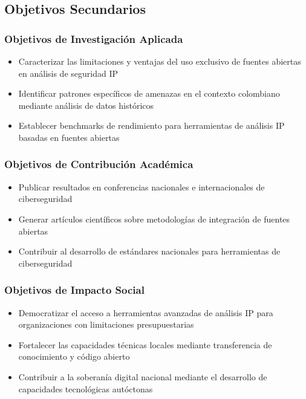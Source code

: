\subsection{Objetivos Secundarios}

\subsubsection{Objetivos de Investigación Aplicada}
\begin{itemize}
    \item Caracterizar las limitaciones y ventajas del uso exclusivo de fuentes abiertas en análisis de seguridad IP
    \item Identificar patrones específicos de amenazas en el contexto colombiano mediante análisis de datos históricos
    \item Establecer benchmarks de rendimiento para herramientas de análisis IP basadas en fuentes abiertas
\end{itemize}

\subsubsection{Objetivos de Contribución Académica}
\begin{itemize}
    \item Publicar resultados en conferencias nacionales e internacionales de ciberseguridad
    \item Generar artículos científicos sobre metodologías de integración de fuentes abiertas
    \item Contribuir al desarrollo de estándares nacionales para herramientas de ciberseguridad
\end{itemize}

\subsubsection{Objetivos de Impacto Social}
\begin{itemize}
    \item Democratizar el acceso a herramientas avanzadas de análisis IP para organizaciones con limitaciones presupuestarias
    \item Fortalecer las capacidades técnicas locales mediante transferencia de conocimiento y código abierto
    \item Contribuir a la soberanía digital nacional mediante el desarrollo de capacidades tecnológicas autóctonas
\end{itemize}
